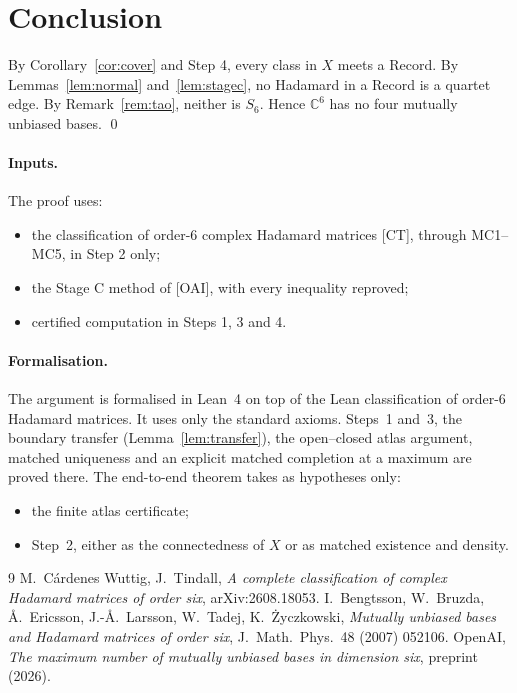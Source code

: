 \documentclass[11pt]{article}
\theoremstyle{remark}
\begin{document}
\section{Conclusion}

By Corollary~\ref{cor:cover} and Step 4, every class in $X$ meets a Record. By Lemmas~\ref{lem:normal} and~\ref{lem:stagec}, no Hadamard in a Record is a quartet edge. By Remark~\ref{rem:tao}, neither is $S_6$. Hence $\mathbb C^6$ has no four mutually unbiased bases. \qed

\paragraph{Inputs.} The proof uses:
\begin{itemize}
\item the classification of order-6 complex Hadamard matrices [CT], through MC1--MC5, in Step 2 only;
\item the Stage C method of [OAI], with every inequality reproved;
\item certified computation in Steps 1, 3 and 4.
\end{itemize}

\paragraph{Formalisation.} The argument is formalised in Lean~4 on top of the Lean classification of order-6 Hadamard matrices. It uses only the standard axioms. Steps~1 and~3, the boundary transfer (Lemma~\ref{lem:transfer}), the open--closed atlas argument, matched uniqueness and an explicit matched completion at a maximum are proved there. The end-to-end theorem takes as hypotheses only:
\begin{itemize}
\item the finite atlas certificate;
\item Step~2, either as the connectedness of $X$ or as matched existence and density.
\end{itemize}

\begin{thebibliography}{9}
 M.~C\'ardenes Wuttig, J.~Tindall, \emph{A complete classification of complex Hadamard matrices of order six}, arXiv:2608.18053.
 I.~Bengtsson, W.~Bruzda, \AA.~Ericsson, J.-\AA.~Larsson, W.~Tadej, K.~\.Zyczkowski, \emph{Mutually unbiased bases and Hadamard matrices of order six}, J.~Math.~Phys.\ 48 (2007) 052106.
 OpenAI, \emph{The maximum number of mutually unbiased bases in dimension six}, preprint (2026).
\end{thebibliography}
\end{document}
